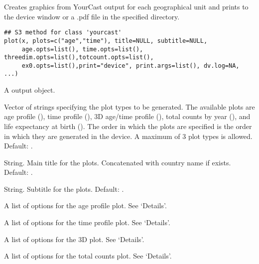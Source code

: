%
\begin{Description}\relax
Creates graphics from YourCast output for each
geographical unit and prints to the device window or a .pdf file in
the specified directory.
\end{Description}
%
\begin{Usage}
\begin{verbatim}
## S3 method for class 'yourcast'
plot(x, plots=c("age","time"), title=NULL, subtitle=NULL, 
     age.opts=list(), time.opts=list(), threedim.opts=list(),totcount.opts=list(), 
     ex0.opts=list(),print="device", print.args=list(), dv.log=NA, ...)
\end{verbatim}
\end{Usage}
%
\begin{Arguments}
\begin{ldescription}

\item[\code{x}] A  output object.

\item[\code{plots}] Vector of strings specifying the plot types to be generated. The available plots are age profile (), time profile (), 3D age/time profile (), total counts by year (), and life expectancy at birth (). The order in which the plots are specified is the order in which they are generated in the device. A maximum of 3 plot types is allowed. Default: .

\item[\code{title}] String. Main title for the plots. Concatenated with country name if  exists. Default: .

\item[\code{subtitle}] String. Subtitle for the plots. Default: .

\item[\code{age.opts}] A list of options for the age profile plot. See `Details'.

\item[\code{time.opts}] A list of options for the time profile plot. See `Details'.

\item[\code{threedim.opts}] A list of options for the 3D plot. See `Details'.

\item[\code{totcount.opts}] A list of options for the total counts plot. See `Details'.


\end{ldescription}
\end{Arguments}
